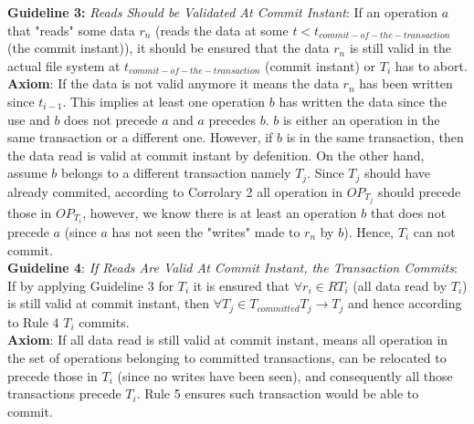 \documentclass[a4paper, 11pt]{article}
\begin{document}
\textbf{Guideline 3:} \emph{Reads Should be Validated At Commit Instant}:
If an operation $a$ that "reads" some data $r_n$ (reads the data at some $t < t_{commit-of-the-transaction}$(the commit instant)), it should be ensured that the data $r_n$ is still valid in the actual file system at $t_{commit-of-the-transaction}$ (commit instant) or $T_i$ has to abort.\\

\textbf{Axiom}: If the data is not valid anymore it means the data $r_n$ has been written since $t_{i-1}$. This implies at least one operation $b$ has written the data since the use and $b$ does not precede $a$ and $a$ precedes $b$. $b$ is either an operation in the same transaction or a different one. However, if $b$ is in the same transaction, then the data read is valid at commit instant by defenition. On the other hand, assume $b$ belongs to a different transaction namely $T_j$. Since $T_j$ should have already commited, according to Corrolary 2 all operation in $OP_{T_j}$ should precede those in $OP_{T_i}$, however, we know there is at least an operation $b$ that does not precede $a$ (since $a$ has not seen the "writes" made to $r_n$ by $b$). Hence, $T_i$ can not commit.\\


\textbf{Guideline 4}: \emph{If Reads Are Valid At Commit Instant, the Transaction Commits}: If by applying Guideline 3 for $T_i$ it is ensured that $\forall r_i \in R{T_i}$ (all data read by $T_i$) is still valid at commit instant, then $\forall T_j \in T_{committed} T_j \rightarrow T_j$ and hence according to Rule 4 $T_i$ commits.\\

\textbf{Axiom}: If all data read is still valid at commit instant, means all operation in the set of operations belonging to committed transactions, can be relocated to precede those in $T_i$ (since no writes have been seen), and consequently all those transactions precede $T_i$. Rule 5 ensures such transaction would be able to commit.\\ 
\end{document}
